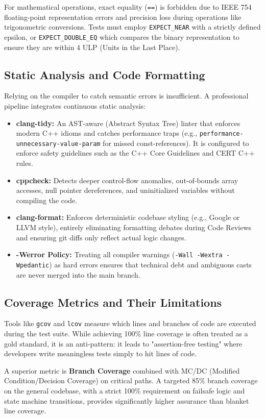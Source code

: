\documentclass{article}
\begin{document}
For mathematical operations, exact equality (\texttt{==}) is forbidden due to IEEE 754 floating-point representation errors and precision loss during operations like trigonometric conversions. Tests must employ \texttt{EXPECT\_NEAR} with a strictly defined epsilon, or \texttt{EXPECT\_DOUBLE\_EQ} which compares the binary representation to ensure they are within 4 ULP (Units in the Last Place).

\subsection{Static Analysis and Code Formatting}
Relying on the compiler to catch semantic errors is insufficient. A professional pipeline integrates continuous static analysis:
\begin{itemize}
    \item \textbf{clang-tidy:} An AST-aware (Abstract Syntax Tree) linter that enforces modern C++ idioms and catches performance traps (e.g., \texttt{performance-unnecessary-value-param} for missed const-references). It is configured to enforce safety guidelines such as the C++ Core Guidelines and CERT C++ rules.
    \item \textbf{cppcheck:} Detects deeper control-flow anomalies, out-of-bounds array accesses, null pointer dereferences, and uninitialized variables without compiling the code.
    \item \textbf{clang-format:} Enforces deterministic codebase styling (e.g., Google or LLVM style), entirely eliminating formatting debates during Code Reviews and ensuring git diffs only reflect actual logic changes.
    \item \textbf{-Werror Policy:} Treating all compiler warnings (\texttt{-Wall -Wextra -Wpedantic}) as hard errors ensures that technical debt and ambiguous casts are never merged into the main branch.
\end{itemize}

\subsection{Coverage Metrics and Their Limitations}
Tools like \texttt{gcov} and \texttt{lcov} measure which lines and branches of code are executed during the test suite. While achieving 100\% line coverage is often treated as a gold standard, it is an anti-pattern: it leads to "assertion-free testing" where developers write meaningless tests simply to hit lines of code. 

A superior metric is \textbf{Branch Coverage} combined with MC/DC (Modified Condition/Decision Coverage) on critical paths. A targeted 85\% branch coverage on the general codebase, with a strict 100\% requirement on failsafe logic and state machine transitions, provides significantly higher assurance than blanket line coverage.
\end{document}
